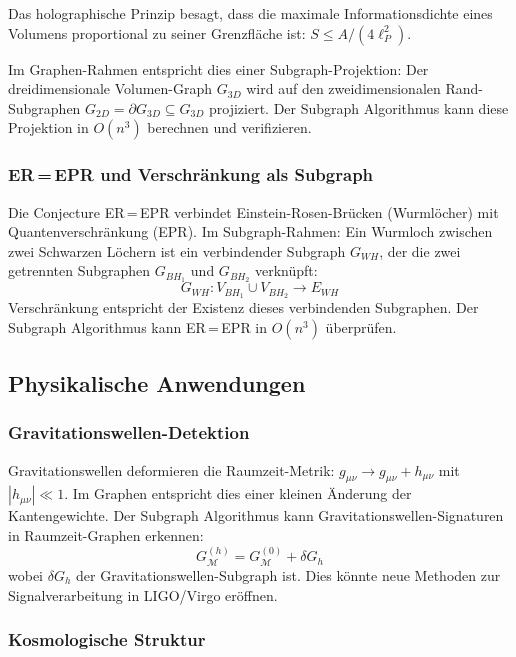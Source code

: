 ﻿\documentclass[a4paper,12pt]{article}
\theoremstyle{definition}
\begin{document}
Das holographische Prinzip \cite{thooft1993} besagt, dass die maximale
Informationsdichte eines Volumens proportional zu seiner Grenzfl\"ache ist:
$S \leq A / (4\ell_P^2)$.

Im Graphen-Rahmen entspricht dies einer Subgraph-Projektion:
Der dreidimensionale Volumen-Graph $G_{3D}$ wird auf den
zweidimensionalen Rand-Subgraphen $G_{2D} = \partial G_{3D} \subseteq G_{3D}$
projiziert. Der Subgraph Algorithmus kann diese Projektion in $O(n^3)$
berechnen und verifizieren.

\subsubsection{ER\,=\,EPR und Verschr\"ankung als Subgraph}

Die Conjecture ER\,=\,EPR \cite{maldacena2013} verbindet
Einstein-Rosen-Br\"ucken (Wurml\"ocher) mit Quantenverschr\"ankung (EPR).
Im Subgraph-Rahmen: Ein Wurmloch zwischen zwei Schwarzen L\"ochern ist
ein verbindender Subgraph $G_{WH}$, der die zwei getrennten Subgraphen
$G_{BH_1}$ und $G_{BH_2}$ verkn\"upft:
\[
G_{WH}: V_{BH_1} \cup V_{BH_2} \to E_{WH}
\]
Verschr\"ankung entspricht der Existenz dieses verbindenden Subgraphen.
Der Subgraph Algorithmus kann ER\,=\,EPR in $O(n^3)$ \"uberpr\"ufen.

\subsection{Physikalische Anwendungen}

\subsubsection{Gravitationswellen-Detektion}

Gravitationswellen \cite{abbott2016} deformieren die Raumzeit-Metrik:
$g_{\mu\nu} \to g_{\mu\nu} + h_{\mu\nu}$ mit $|h_{\mu\nu}| \ll 1$.
Im Graphen entspricht dies einer kleinen \"Anderung der Kantengewichte.
Der Subgraph Algorithmus kann Gravitationswellen-Signaturen in
Raumzeit-Graphen erkennen:
\[
G_{\mathcal{M}}^{(h)} = G_{\mathcal{M}}^{(0)} + \delta G_h
\]
wobei $\delta G_h$ der Gravitationswellen-Subgraph ist. Dies k\"onnte
neue Methoden zur Signalverarbeitung in LIGO/Virgo er\"offnen.

\subsubsection{Kosmologische Struktur}
\end{document}
